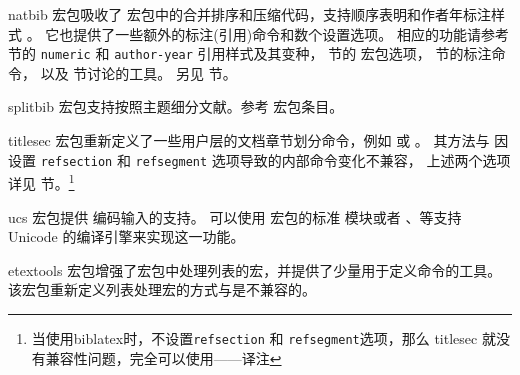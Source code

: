 \begin{marglist}
\item[natbib]
 宏包吸收了 宏包中的合并排序和压缩代码，支持顺序表明和作者年标注样式 。
它也提供了一些额外的标注(引用)命令和数个设置选项。
相应的功能请参考  节的 \texttt{numeric} 和 \texttt{author-year} 引用样式及其变种，
 节的  宏包选项， 节的标注命令，
以及  节讨论的工具。
另见  节。

\item[splitbib]
 宏包支持按照主题细分文献。参考  宏包条目。

\item[titlesec]
 宏包重新定义了一些用户层的文档章节划分命令，例如  或 。
其方法与 \biblatex 因设置 \texttt{refsection} 和 \texttt{refsegment} 选项导致的内部命令变化不兼容，
上述两个选项详见 节。\footnote{当使用biblatex时，不设置\texttt{refsection} 和 \texttt{refsegment}选项，那么 titlesec 就没有兼容性问题，完全可以使用——译注}

\item[ucs]
 宏包提供 \utf 编码输入的支持。
可以使用  宏包的标准  模块或者 \XeTeX 、\LuaTeX 等支持 Unicode 的编译引擎来实现这一功能。

\item[etextools]
宏包增强了宏包中处理列表的宏，并提供了少量用于定义命令的工具。
该宏包重新定义列表处理宏的方式与\biblatex 是不兼容的。

\end{marglist}

